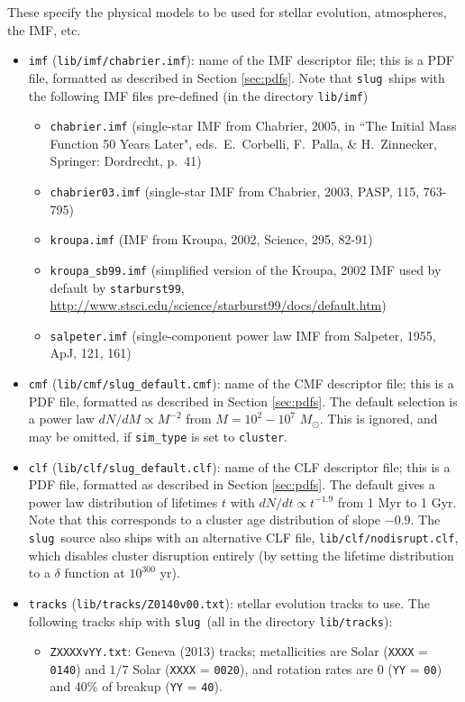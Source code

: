 \documentclass[12pt]{article}
\newcommand{\slug}{\texttt{slug}}
\begin{document}
These specify the physical models to be used for stellar evolution, atmospheres, the IMF, etc.
\begin{itemize}
\item \verb=imf= (\verb=lib/imf/chabrier.imf=): name of the IMF descriptor file; this is a PDF file, formatted as described in Section \ref{sec:pdfs}. Note that \slug\ ships with the following IMF files pre-defined (in the directory \verb=lib/imf=)
\begin{itemize}
\item \verb=chabrier.imf= (single-star IMF from Chabrier, 2005, in ``The Initial Mass Function 50 Years Later", eds.~E.~Corbelli, F.~Palla, \& H.~Zinnecker, Springer: Dordrecht, p.~41)
\item \verb=chabrier03.imf= (single-star IMF from Chabrier, 2003, PASP, 115, 763-795)
\item \verb=kroupa.imf= (IMF from Kroupa, 2002, Science, 295, 82-91)
\item \verb=kroupa_sb99.imf= (simplified version of the Kroupa, 2002 IMF used by default by \verb=starburst99=, \url{http://www.stsci.edu/science/starburst99/docs/default.htm})
\item \verb=salpeter.imf= (single-component power law IMF from Salpeter, 1955, ApJ, 121, 161)
\end{itemize}
\item \verb=cmf= (\verb=lib/cmf/slug_default.cmf=): name of the CMF descriptor file; this is a PDF file, formatted as described in Section \ref{sec:pdfs}. The default selection is a power law $dN/dM \propto M^{-2}$ from $M= 10^2 - 10^7$ $M_\odot$. This is ignored, and may be omitted, if \verb=sim_type= is set to \verb=cluster=.
\item \verb=clf= (\verb=lib/clf/slug_default.clf=): name of the CLF descriptor file; this is a PDF file, formatted as described in Section \ref{sec:pdfs}. The default gives a power law distribution of lifetimes $t$ with $dN/dt\propto t^{-1.9}$ from 1 Myr to 1 Gyr. Note that this corresponds to a cluster age distribution of slope $-0.9$. The \slug\ source also ships with an alternative CLF file, \verb=lib/clf/nodisrupt.clf=, which disables cluster disruption entirely (by setting the lifetime distribution to a $\delta$ function at $10^{300}$ yr).
\item \verb=tracks= (\verb=lib/tracks/Z0140v00.txt=): stellar evolution tracks to use. The following tracks ship with \slug\ (all in the directory \verb=lib/tracks=):
\begin{itemize}
\item \verb=ZXXXXvYY.txt=: Geneva (2013) tracks; metallicities are Solar (\verb=XXXX= = \verb=0140=) and $1/7$ Solar (\verb=XXXX= = \verb=0020=), and rotation rates are 0 (\verb=YY= = \verb=00=) and 40\% of breakup (\verb=YY= = \verb=40=).

\end{itemize}
\end{itemize}
\end{document}
